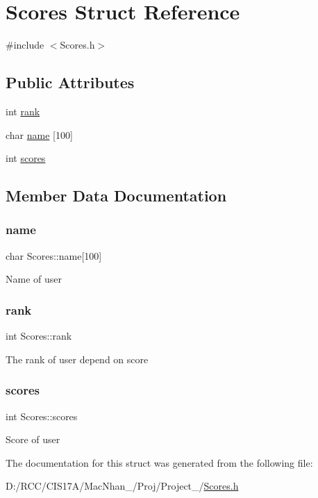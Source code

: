 \hypertarget{struct_scores}{}\section{Scores Struct Reference}
\label{struct_scores}


{\ttfamily \#include $<$Scores.\+h$>$}

\subsection*{Public Attributes}
\begin{DoxyCompactItemize}
\item 
int \hyperlink{struct_scores_aab2bf0fee1a8c2b6e85862c526ddbfae}{rank}
\item 
char \hyperlink{struct_scores_adc73cbe7efd07c64771ce7b0ef6c8a74}{name} \mbox{[}100\mbox{]}
\item 
int \hyperlink{struct_scores_adc160fc30f754360378856a273fef5e2}{scores}
\end{DoxyCompactItemize}


\subsection{Member Data Documentation}
\mbox{\label{struct_scores_adc73cbe7efd07c64771ce7b0ef6c8a74}} 
\subsubsection{\texorpdfstring{name}{name}}
{\footnotesize\ttfamily char Scores\+::name\mbox{[}100\mbox{]}}

Name of user \mbox{\label{struct_scores_aab2bf0fee1a8c2b6e85862c526ddbfae}} 
\subsubsection{\texorpdfstring{rank}{rank}}
{\footnotesize\ttfamily int Scores\+::rank}

The rank of user depend on score \mbox{\label{struct_scores_adc160fc30f754360378856a273fef5e2}} 
\subsubsection{\texorpdfstring{scores}{scores}}
{\footnotesize\ttfamily int Scores\+::scores}

Score of user 

The documentation for this struct was generated from the following file\+:\begin{DoxyCompactItemize}
\item 
D\+:/\+R\+C\+C/\+C\+I\+S17\+A/\+Mac\+Nhan\+\_/\+Proj/\+Project\+\_/\hyperlink{_scores_8h}{Scores.\+h}\end{DoxyCompactItemize}
